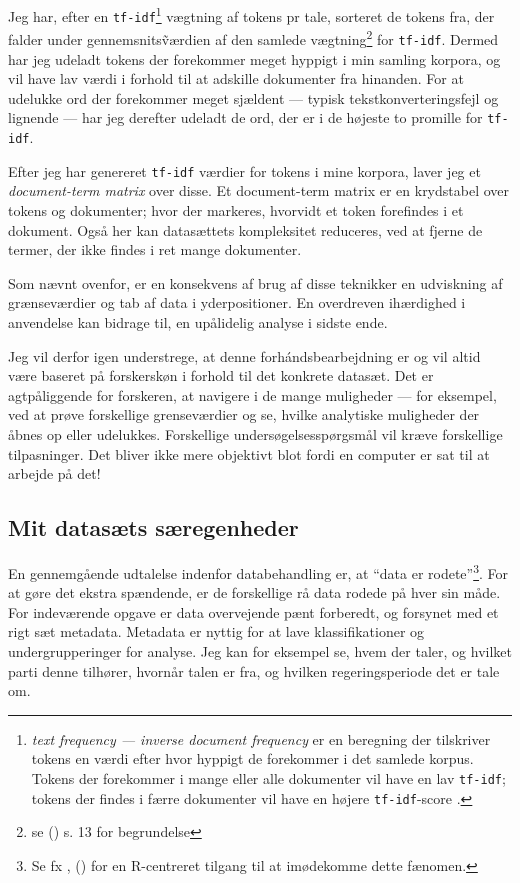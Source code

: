 Jeg har, efter en \texttt{tf-idf}\footnote{\textit{text frequency — inverse document frequency} er en beregning der tilskriver tokens en værdi efter hvor hyppigt de forekommer i det samlede korpus.
  Tokens der forekommer i mange eller alle dokumenter vil have en lav \texttt{tf-idf}; tokens der findes i færre dokumenter vil have en højere \texttt{tf-idf}-score \autocite[s. 29]{silge2017text}.} vægtning af tokens pr tale, sorteret de tokens fra, der falder under gennemsnits\~værdien af den samlede vægtning\footnote{se \citeauthor{grunTopicmodelsPackageFitting2011} (\citeyear{grunTopicmodelsPackageFitting2011}) s. 13 for begrundelse} for \texttt{tf-idf}.
Dermed har jeg udeladt tokens der forekommer meget hyppigt i min samling korpora, og vil have lav værdi i forhold til at adskille dokumenter fra hinanden.
For at udelukke ord der forekommer meget sjældent — typisk tekstkonverteringsfejl og lignende — har jeg derefter udeladt de ord, der er i de højeste to promille for \texttt{tf-idf}.

Efter jeg har genereret \texttt{tf-idf} værdier for tokens i mine korpora, laver jeg et \textit{document-term matrix} over disse.
Et document-term matrix er en krydstabel over tokens og dokumenter; hvor der markeres, hvorvidt et token forefindes i et dokument.
Også her kan datasættets kompleksitet reduceres, ved at fjerne de termer, der ikke findes i ret mange dokumenter.

Som nævnt ovenfor, er en konsekvens af brug af disse teknikker en udviskning af grænseværdier og tab af data i yderpositioner.
En overdreven ihærdighed i anvendelse kan bidrage til, en upålidelig analyse i sidste ende.

Jeg vil derfor igen understrege, at denne forhándsbearbejdning er og vil altid være baseret på forskerskøn i forhold til det konkrete datasæt.
Det er agtpåliggende for forskeren, at navigere i de mange muligheder — for eksempel, ved at prøve forskellige grenseværdier og se, hvilke analytiske muligheder der åbnes op eller udelukkes.
Forskellige undersøgelsesspørgsmål vil kræve forskellige tilpasninger.
Det bliver ikke mere objektivt blot fordi en computer er sat til at arbejde på det!

\subsection{Mit datasæts særegenheder}

En gennemgående udtalelse indenfor databehandling er, at “data er rodete”\footnote{Se fx \citeauthor{wickhamTidyData2014}, (\citeyear{wickhamTidyData2014}) for en R-centreret tilgang til at imødekomme dette fænomen.}.
For at gøre det ekstra spændende, er de forskellige rå data rodede på hver sin måde.
For indeværende opgave er data overvejende pænt forberedt, og forsynet med et rigt sæt metadata.
Metadata er nyttig for at lave klassifikationer og undergrupperinger for analyse.
Jeg kan for eksempel se, hvem der taler, og hvilket parti denne tilhører, hvornår talen er fra, og hvilken regeringsperiode det er tale om.

